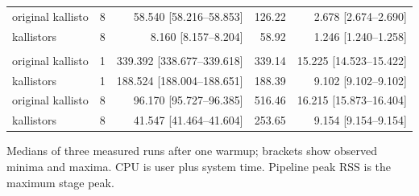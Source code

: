\begin{longtable}{@{}lrrrr@{}}
original kallisto & 8 & 58.540 [58.216--58.853] & 126.22 & 2.678 [2.674--2.690] \\
kallistors & 8 & 8.160 [8.157--8.204] & 58.92 & 1.246 [1.240--1.258] \\
\addlinespace
\multicolumn{5}{@{}l}{\textit{nascent: SRR10919051}} \\
original kallisto & 1 & 339.392 [338.677--339.618] & 339.14 & 15.225 [14.523--15.422] \\
kallistors & 1 & 188.524 [188.004--188.651] & 188.39 & 9.102 [9.102--9.102] \\
original kallisto & 8 & 96.170 [95.727--96.385] & 516.46 & 16.215 [15.873--16.404] \\
kallistors & 8 & 41.547 [41.464--41.604] & 253.65 & 9.154 [9.154--9.154] \\
\end{longtable}
\noindent\footnotesize Medians of three measured runs after one warmup; brackets show observed minima and maxima. CPU is user plus system time. Pipeline peak RSS is the maximum stage peak.
\endgroup
